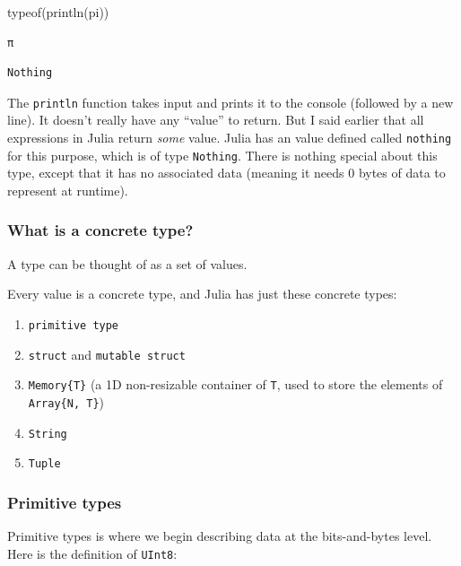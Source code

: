 \documentclass[
]{article}
\newenvironment{Shaded}{\begin{snugshade}}{\end{snugshade}}
\newcommand{\ConstantTok}[1]{\textcolor[rgb]{0.56,0.35,0.01}{#1}}
\newcommand{\FunctionTok}[1]{\textcolor[rgb]{0.28,0.35,0.67}{#1}}
\newcommand{\NormalTok}[1]{\textcolor[rgb]{0.00,0.23,0.31}{#1}}
\providecommand{\tightlist}{%
  \setlength{\itemsep}{0pt}\setlength{\parskip}{0pt}}
\begin{document}
\begin{Shaded}
\begin{Highlighting}[]
\FunctionTok{typeof}\NormalTok{(}\FunctionTok{println}\NormalTok{(}\ConstantTok{pi}\NormalTok{))}
\end{Highlighting}
\end{Shaded}

\begin{verbatim}
π
\end{verbatim}

\begin{verbatim}
Nothing
\end{verbatim}

The \texttt{println} function takes input and prints it to the console
(followed by a new line). It doesn't really have any ``value'' to
return. But I said earlier that all expressions in Julia return
\emph{some} value. Julia has an value defined called \texttt{nothing}
for this purpose, which is of type \texttt{Nothing}. There is nothing
special about this type, except that it has no associated data (meaning
it needs 0 bytes of data to represent at runtime).

\subsubsection{What is a concrete type?}\label{what-is-a-concrete-type}

A type can be thought of as a set of values.

Every value is a concrete type, and Julia has just these concrete types:

\begin{enumerate}
\def\labelenumi{\arabic{enumi}.}
\tightlist
\item
  \texttt{primitive\ type}
\item
  \texttt{struct} and \texttt{mutable\ struct}
\item
  \texttt{Memory\{T\}} (a 1D non-resizable container of \texttt{T}, used
  to store the elements of \texttt{Array\{N,\ T\}})
\item
  \texttt{String}
\item
  \texttt{Tuple}
\end{enumerate}

\subsubsection{Primitive types}\label{primitive-types}

Primitive types is where we begin describing data at the bits-and-bytes
level. Here is the definition of \texttt{UInt8}:
\end{document}
